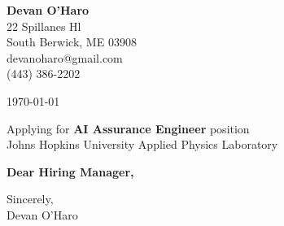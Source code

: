 \documentclass[12pt]{article}
\makeatletter
\newcommand{\yourname}{Devan O'Haro}
\newcommand{\youraddress}{22 Spillanes Hl}
\newcommand{\yourcitystatezip}{South Berwick, ME 03908}
\newcommand{\youremail}{devanoharo@gmail.com}
\newcommand{\yourphone}{(443) 386-2202}
\newcommand{\dateofletter}{\today}
\newcommand{\recipient}{Hiring Manager}
\newcommand{\companyname}{Johns Hopkins University Applied Physics Laboratory}
\newcommand{\companycitystatezip}{Laurel, MD}
\newcommand{\job}{AI Assurance Engineer}
\makeatother
\begin{document}
\noindent
\begin{minipage}[t]{0.6\textwidth}
    \textbf{\yourname} \\
    \youraddress \\
    \yourcitystatezip \\
    \youremail \\
    \yourphone
\end{minipage}%
\hfill
\begin{minipage}[t]{0.35\textwidth}
    \raggedleft
    \dateofletter
\end{minipage}
\vspace{2em}

\noindent
Applying for \textbf{\job} position\\
\companyname \\
\vspace{2em}

\noindent
\textbf{Dear \recipient,} \\
\vspace{1em}

\noindent
\vspace{1em}

\noindent
Sincerely, \\
\vspace{2em}
\yourname
\end{document}
